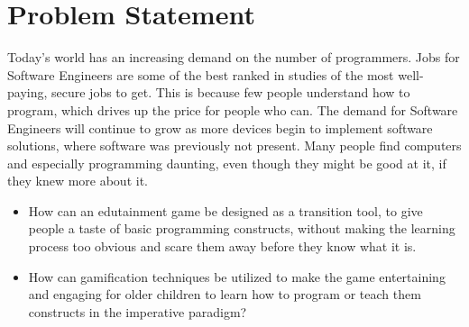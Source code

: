 \section{Problem Statement}
\label{sec:problemstatement}

Today's world has an increasing demand on the number of programmers. Jobs for Software Engineers are some of the best ranked in studies of the most well-paying, secure jobs to get.
This is because few people understand how to program, which drives up the price for people who can. The demand for Software Engineers will continue to grow as more devices begin to implement software solutions, where software was previously not present.
Many people find computers and especially programming daunting, even though they might be good at it, if they knew more about it.\newline

\begin{itemize}
\item How can an edutainment game be designed as a transition tool, to give people a taste of basic programming constructs, without making the learning process too obvious and scare them away before they know what it is.
\item How can gamification techniques be utilized to make the game entertaining and engaging for older children to learn how to program or teach them constructs in the imperative paradigm?
\end{itemize}
